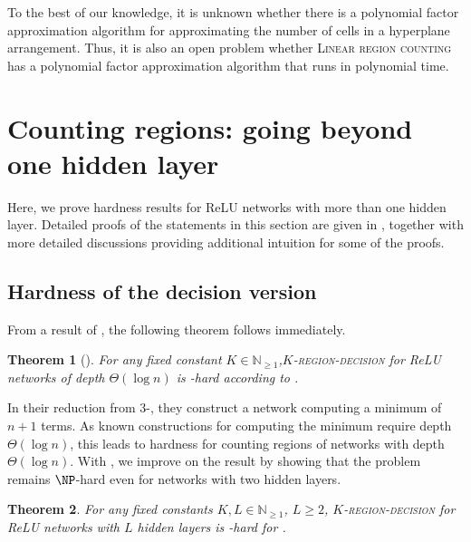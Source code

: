 \documentclass{article}
\newtheorem{theorem}{Theorem}[section]
\begin{document}
To the best of our knowledge, it is unknown whether there is a polynomial factor approximation algorithm for approximating the number of cells in a hyperplane arrangement.
Thus, it is also an open problem whether \textsc{Linear region counting} has a polynomial factor approximation algorithm that runs in polynomial time.

\section{Counting regions: going beyond one hidden layer}
\label{sec:deep}
Here, we prove hardness results for ReLU networks with more than one hidden layer. Detailed proofs of the statements in this section are given in , together with more detailed discussions providing additional intuition for some of the proofs.

\subsection{Hardness of the decision version}
From a result of \citet{wang2022estimation}, the following theorem follows immediately.
\begin{theorem}[\citep{wang2022estimation}]
    For any fixed constant $K\in \mathbb{N}_{\geq 1}$,\textsc{$K$-region-decision} for ReLU networks of depth $\Theta(\log n)$ is \NP-hard according to .
\end{theorem}
In their reduction from 3-\SAT, they construct a network computing a minimum of $n+1$ terms. As known constructions for computing the minimum require depth $\Theta(\log n)$, this leads to hardness for counting regions of networks with depth $\Theta(\log n)$.
With , we improve on the result by showing that the problem remains $\NP$-hard even for networks with two hidden layers.
\begin{theorem}\label{thm:np_hardness_Kregion_decision}
    For any fixed constants $K, L\in \mathbb{N}_{\geq 1}$, $L\geq 2$, \textsc{$K$-region-decision} for ReLU networks with $L$ hidden layers is \NP-hard for .
\end{theorem}
\end{document}
